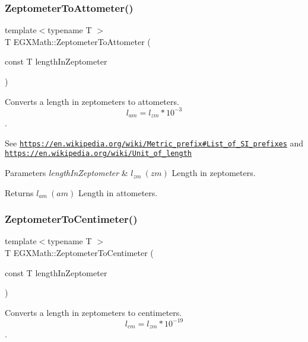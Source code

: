 \subsubsection{\texorpdfstring{Zeptometer\+To\+Attometer()}{ZeptometerToAttometer()}}
{\footnotesize\ttfamily template$<$typename T $>$ \\
T E\+G\+X\+Math\+::\+Zeptometer\+To\+Attometer (\begin{DoxyParamCaption}\item[{const T}]{length\+In\+Zeptometer }\end{DoxyParamCaption})}



Converts a length in zeptometers to attometers. \[ l_{am}=l_{zm} * 10^{-3} \]. 

See \href{https://en.wikipedia.org/wiki/Metric_prefix#List_of_SI_prefixes}{\tt https\+://en.\+wikipedia.\+org/wiki/\+Metric\+\_\+prefix\#\+List\+\_\+of\+\_\+\+S\+I\+\_\+prefixes} and \href{https://en.wikipedia.org/wiki/Unit_of_length}{\tt https\+://en.\+wikipedia.\+org/wiki/\+Unit\+\_\+of\+\_\+length} 
\begin{DoxyParams}{Parameters}
{\em length\+In\+Zeptometer} & $ l_{zm}\ (zm)$ Length in zeptometers. \\
\hline
\end{DoxyParams}
\begin{DoxyReturn}{Returns}
$ l_{am}\ (am)$ Length in attometers. 
\end{DoxyReturn}
\mbox{\label{group___e_g_x_math-_conversions-_length_conversions-_s_i-_zeptometer-_s_i_ga11d9546ba555e2fca128d6c905fed139}} 
\subsubsection{\texorpdfstring{Zeptometer\+To\+Centimeter()}{ZeptometerToCentimeter()}}
{\footnotesize\ttfamily template$<$typename T $>$ \\
T E\+G\+X\+Math\+::\+Zeptometer\+To\+Centimeter (\begin{DoxyParamCaption}\item[{const T}]{length\+In\+Zeptometer }\end{DoxyParamCaption})}



Converts a length in zeptometers to centimeters. \[ l_{cm}=l_{zm} * 10^{-19} \]. 

